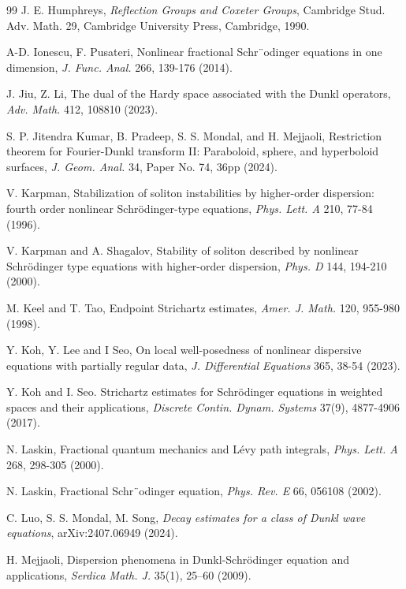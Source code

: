 \documentclass[a4paper,11pt, reqno]{amsart}
\theoremstyle{definition}
\theoremstyle{remark}
\numberwithin{equation}{section}
\begin{document}
\begin{thebibliography}{99}
         J. E. Humphreys, \emph{Reflection Groups and Coxeter Groups}, Cambridge Stud. Adv. Math. 29, Cambridge University Press, Cambridge, 1990. 

         A-D. Ionescu, F. Pusateri, Nonlinear fractional Schr¨odinger equations in one dimension, \emph{J. Func. Anal.} 266, 139-176 (2014).

         J. Jiu, Z. Li, {The dual of the Hardy space associated with the Dunkl operators}, \emph{Adv. Math.} {412}, 108810 (2023).
				
         S. P. Jitendra Kumar, B. Pradeep, S. S.   Mondal,  and H. Mejjaoli, {Restriction theorem for Fourier-Dunkl transform II: Paraboloid, sphere, and hyperboloid surfaces}, \emph{J. Geom. Anal.} {34}, Paper No. 74, 36pp (2024).

         	V. Karpman, Stabilization of soliton instabilities by higher-order dispersion: fourth order nonlinear Schr\"odinger-type equations, \emph{Phys. Lett. A} 210, 77-84  (1996).

          	V. Karpman and A. Shagalov, Stability of soliton described by nonlinear Schrödinger type equations with higher-order dispersion, \emph{Phys. D} 144, 194-210 (2000). 

         	M. Keel and T. Tao, Endpoint Strichartz estimates, \emph{Amer. J. Math.} 120, 955-980 (1998).

          	Y.  Koh, Y.  Lee and  I Seo, On local well-posedness of nonlinear dispersive equations with partially regular data, 	\emph{J. Differential Equations} 	 365, 38-54	(2023).

          	Y. Koh and I. Seo. Strichartz estimates for Schrödinger equations in weighted 		spaces and their applications, \emph{Discrete Contin. Dynam. Systems} 37(9), 4877-4906 (2017).

          N. Laskin, Fractional quantum mechanics and Lévy path integrals, \emph{Phys. Lett. A} 268, 298-305 (2000).  

          N. Laskin, Fractional Schr¨odinger equation, \emph{Phys. Rev. E} 66, 056108 (2002).
		
        \label{LMS} C. Luo, S. S. Mondal, M. Song, \emph{Decay estimates for a class of Dunkl wave equations},  arXiv:2407.06949 (2024).

         H. Mejjaoli,  Dispersion phenomena in Dunkl-Schr\"{o}dinger equation and applications,
		\emph{Serdica Math. J.} {35}(1), 25–60 (2009).


\end{thebibliography}
\end{document}
